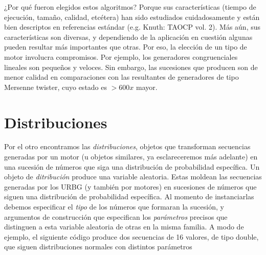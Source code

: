 \documentclass{article}
\begin{document}
¿Por qué fueron elegidos estos algoritmos?
Porque sus características (tiempo de ejecución, tamaño, calidad, etcétera) han sido estudiados cuidadosamente y están bien descriptos en referencias estándar (e.g. Knuth: TAOCP vol. 2).
Más aún, sus características son diversas, y dependiendo de la aplicación en cuestión algunas pueden resultar más importantes que otras.
Por eso, la elección de un tipo de motor involucra compromisos.
Por ejemplo, los generadores congruenciales lineales son pequeños y veloces.
Sin embargo, las sucesiones que producen son de menor calidad en comparaciones con las resultantes de generadores de tipo Mersenne twister, cuyo estado es $> 600 x$ mayor.

\section{Distribuciones}
Por el otro encontramos las \emph{distribuciones}, objetos que transforman secuencias generadas por un motor (u objetos similares, ya esclareceremos más adelante) en una sucesión de números que siga una distribución de probabilidad específica.
Un objeto de \emph{ditribución} produce una variable aleatoria.
Estas moldean las secuencias generadas por los URBG (y también por motores) en sucesiones de números que siguen una distribución de probabilidad específica.
Al momento de instanciarlas debemos especificar el \emph{tipo} de los números que formaran la sucesión, y argumentos de construcción que especifican los \emph{parámetros} precisos que distinguen a esta variable aleatoria de otras en la misma familia.
A modo de ejemplo, el siguiente código produce dos secuencias de 16 valores, de tipo double, que siguen distribuciones normales con distintos parámetros 


\end{document}
